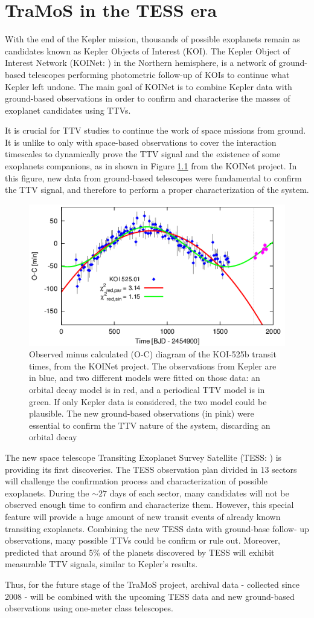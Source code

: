 \chapter{TraMoS in the TESS era}\label{chap:tess}

With the end of the Kepler mission, thousands of possible exoplanets remain as candidates known as Kepler Objects of Interest (KOI). The Kepler Object of Interest Network (KOINet: \citep{vonEssen2018,Freuddenthal2018}) in the Northern hemisphere, is a network of ground-based telescopes performing photometric follow-up of KOIs to continue what Kepler left undone. The main goal of KOINet is to combine Kepler data with ground-based observations in order to confirm and characterise the masses of exoplanet candidates using TTVs.

It is crucial for TTV studies to continue the work of space missions from ground. It is unlike to only with space-based observations to cover the interaction timescales to dynamically prove the TTV signal and the existence of some exoplanets companions, as in shown in Figure \ref{koinet} from the KOINet project. In this figure, new data from ground-based telescopes were fundamental to confirm the TTV signal, and therefore to perform a proper characterization of the system.

\begin{figure}
\centering
\includegraphics[width=0.7\columnwidth]{imagenes/koinet.png}
\caption{Observed minus calculated (O-C) diagram of the KOI-525b transit times, from the KOINet project. The observations from Kepler are in blue, and two different models were fitted on those data: an orbital decay model is in red, and a periodical TTV model is in green. If only Kepler data is considered, the two model could be plausible. The new ground-based observations (in pink) were essential to confirm the TTV nature of the system, discarding an orbital decay}
\label{koinet}
\end{figure}

The new space telescope Transiting Exoplanet Survey Satellite (TESS: \cite{Ricker2014}) is providing its first discoveries. The TESS observation plan divided in 13 sectors will challenge the confirmation process and characterization of possible exoplanets. During the $\sim27$ days of each sector, many candidates will not be observed enough time to confirm and characterize them. However, this special feature will provide a huge amount of new transit events of already known transiting exoplanets. Combining the new TESS data with ground-base follow- up observations, many possible TTVs could be confirm or rule out. Moreover, \cite{Ballard2018} predicted that around 5\% of the planets discovered by TESS will exhibit measurable TTV signals, similar to Kepler’s results.

Thus, for the future stage of the TraMoS project, archival data - collected since 2008 - will be combined with the upcoming TESS data and new ground-based observations using one-meter class telescopes. 


